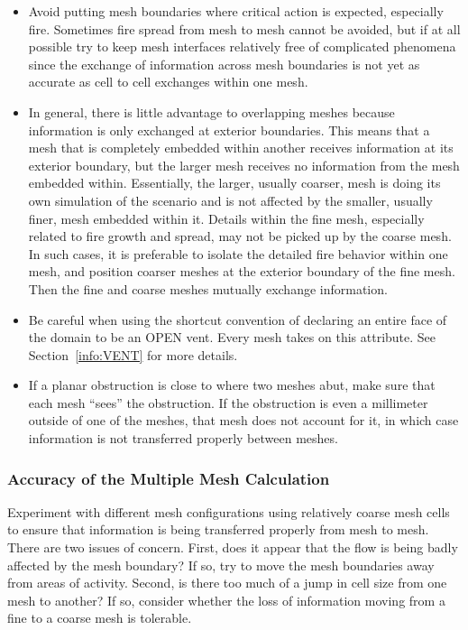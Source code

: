 \documentclass[11pt]{book}
\begin{document}
\begin{itemize}
\item Avoid putting mesh boundaries where critical action is expected, especially fire. Sometimes fire spread from mesh to mesh cannot be avoided, but if at all possible try to keep mesh interfaces relatively free of complicated phenomena since the exchange of information across mesh boundaries is not yet as accurate as cell to cell exchanges within one mesh.
\item In general, there is little advantage to overlapping meshes because information is only exchanged at exterior boundaries. This means that a mesh that is completely embedded within another receives information at its exterior boundary, but the larger mesh receives no information from the mesh embedded within. Essentially, the larger, usually coarser, mesh is doing its own simulation of the scenario and is not affected by the smaller, usually finer, mesh embedded within it. Details within the fine mesh, especially related to fire growth and spread, may not be picked up by the coarse mesh. In such cases, it is preferable to isolate the detailed fire behavior within one mesh, and position coarser meshes at the exterior boundary of the fine mesh. Then the fine and coarse meshes mutually exchange information.
\item Be careful when using the shortcut convention of declaring an entire face of the domain to be an {\ct OPEN} vent. Every mesh takes on this attribute. See Section~\ref{info:VENT} for more details.
\item If a planar obstruction is close to where two meshes abut, make sure that each mesh ``sees'' the obstruction. If the obstruction is even a millimeter outside of one of the meshes, that mesh does not account for it, in which case information is not transferred properly between meshes.
\end{itemize}


\subsubsection{Accuracy of the Multiple Mesh Calculation}

Experiment with different mesh configurations using relatively coarse mesh cells to ensure that information is being transferred properly from mesh to mesh. There are two issues of concern. First, does it appear that the flow is being badly affected by the mesh boundary? If so, try to move the mesh boundaries away from areas of activity. Second, is there too much of a jump in cell size from one mesh to another? If so, consider whether the loss of information moving from a fine to a coarse mesh is tolerable.
\end{document}
